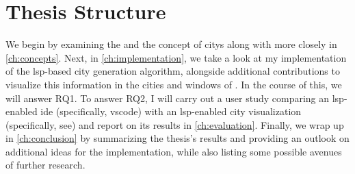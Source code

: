 \documentclass[../thesis]{subfiles}
\begin{document}
\section{Thesis Structure}

We begin by examining the  and the concept of \glspl{city} along with \SEE{} more closely in \cref{ch:concepts}.
Next, in \cref{ch:implementation}, we take a look at my implementation of the \gls{lsp}-based \gls{city} generation algorithm, alongside additional contributions to visualize this information in the cities and \glspl{window} of \SEE{}.
In the course of this, we will answer \textsf{RQ1}.
To answer \textsf{RQ2}, I will carry out a user study comparing an \gls{lsp}-enabled \gls{ide} (specifically, \gls{vscode}) with an \gls{lsp}-enabled \gls{city} visualization (specifically, \gls{see}) and report on its results in \cref{ch:evaluation}.
Finally, we wrap up in \cref{ch:conclusion} by summarizing the thesis's results and providing an outlook on additional ideas for the implementation, while also listing some possible avenues of further research.
\end{document}
